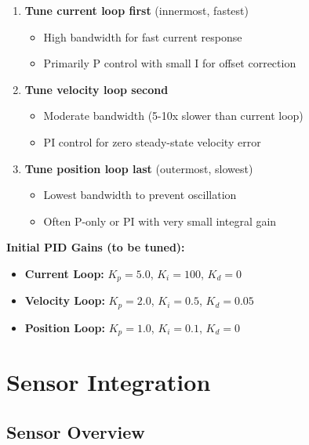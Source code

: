 \documentclass[11pt,letterpaper]{article}
\begin{document}
\begin{enumerate}
    \item \textbf{Tune current loop first} (innermost, fastest)
    \begin{itemize}
        \item High bandwidth for fast current response
        \item Primarily P control with small I for offset correction
    \end{itemize}

    \item \textbf{Tune velocity loop second}
    \begin{itemize}
        \item Moderate bandwidth (5-10x slower than current loop)
        \item PI control for zero steady-state velocity error
    \end{itemize}

    \item \textbf{Tune position loop last} (outermost, slowest)
    \begin{itemize}
        \item Lowest bandwidth to prevent oscillation
        \item Often P-only or PI with very small integral gain
    \end{itemize}
\end{enumerate}

\begin{ournumbers}
\textbf{Initial PID Gains (to be tuned):}
\begin{itemize}[noitemsep]
    \item \textbf{Current Loop:} $K_p = 5.0$, $K_i = 100$, $K_d = 0$
    \item \textbf{Velocity Loop:} $K_p = 2.0$, $K_i = 0.5$, $K_d = 0.05$
    \item \textbf{Position Loop:} $K_p = 1.0$, $K_i = 0.1$, $K_d = 0$
\end{itemize}
\end{ournumbers}

\newpage
\section{Sensor Integration}

\subsection{Sensor Overview}
\end{document}
